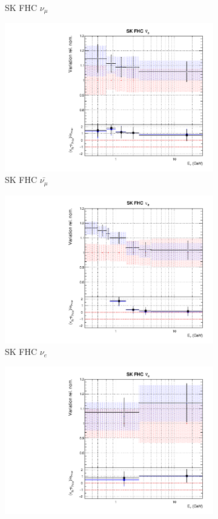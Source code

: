 \begin{figure}
\begin{subfigure}{0.45\textwidth}
  \caption{SK FHC $\nu_{\mu}$}
\end{subfigure}
\begin{subfigure}{0.45\textwidth}
  \centering
  \includegraphics[width=0.75\linewidth]{figs/fixed2p2hflux9}
  \caption{SK FHC $\bar{\nu_{\mu}}$}
\end{subfigure}
\begin{subfigure}{0.45\textwidth}
  \centering
  \includegraphics[width=0.75\linewidth]{figs/fixed2p2hflux10}
  \caption{SK FHC $\nu_e$}
\end{subfigure}
\begin{subfigure}{0.45\textwidth}
  \centering
  \includegraphics[width=0.75\linewidth]{figs/fixed2p2hflux11}

\end{subfigure}
\end{figure}
